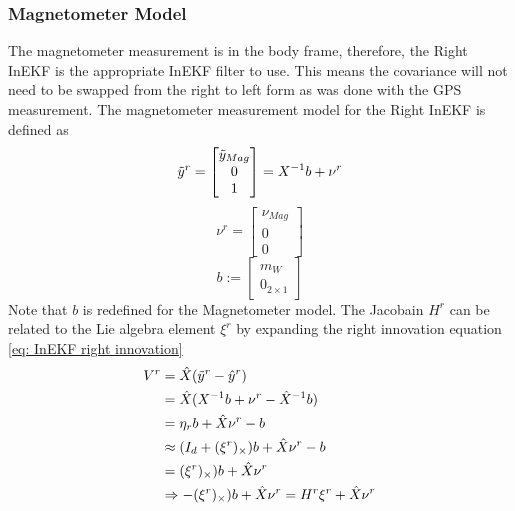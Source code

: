 \subsubsection{Magnetometer Model}
The magnetometer measurement is in the body frame, therefore, the Right InEKF is the appropriate InEKF filter to use. This means the covariance will not need to be swapped from the right to left form as was done with the GPS measurement. The magnetometer measurement model for the Right InEKF is defined as
\begin{equation}
    \Tilde{y}^r = \begin{bmatrix}
        \Tilde{y}_{Mag} \\
        0 \\
        1
    \end{bmatrix} = X^{-1} b + \nu^r
    \label{eq: y meas RInEKF}
\end{equation}
\begin{equation}
    \nu^r = \begin{bmatrix}
        \nu_{Mag} \\
        0 \\
        0
    \end{bmatrix}
    \label{eq: right measurment noise}
\end{equation}
\begin{equation}
    b := \begin{bmatrix}
        m_W \\
        0_{2 \times 1}
    \end{bmatrix}
    \label{eq: b RInEKF}
\end{equation}
Note that $b$ is redefined for the Magnetometer model. The Jacobain $H^r$ can be related to the Lie algebra element $\xi^r$ by expanding the right innovation equation \eqref{eq: InEKF right innovation}
\begin{equation}
    \begin{split}
        V^r &= \hat{X} (\Tilde{y}^r - \hat{y}^r) \\
            &= \hat{X} (X^{-1} b + \nu^r - \hat{X}^{-1} b) \\
            &= \eta_r b + \hat{X} \nu^r - b \\
            &\approx (I_d + (\xi^r)_{\times}) b + \hat{X} \nu^r - b \\
            &= (\xi^r)_{\times}) b + \hat{X} \nu^r \\
            &\Rightarrow -(\xi^r)_{\times}) b + \hat{X} \nu^r = H^r \xi^r + \hat{X} \nu^r \\
    \end{split}
    \label{eq: H for mag derivation}
\end{equation}
